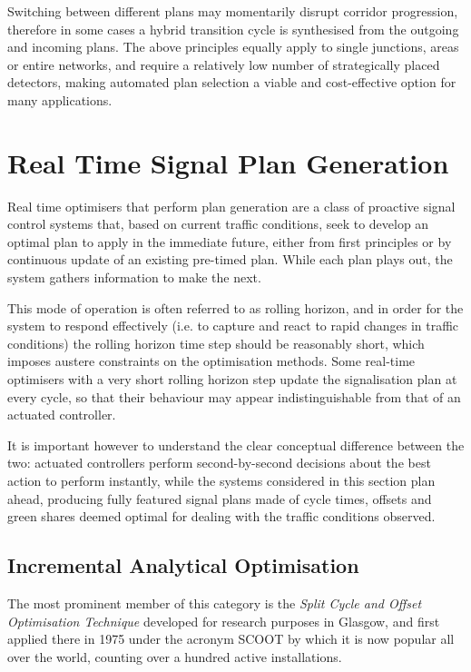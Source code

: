 Switching between different plans may momentarily disrupt corridor progression, therefore in
some cases a hybrid transition cycle is synthesised from the outgoing and incoming plans.
The above principles equally apply to single junctions, areas or entire networks, and require a
relatively low number of strategically placed detectors, making automated plan selection a
viable and cost-effective option for many applications.
 

\section{Real Time Signal Plan Generation}
Real time optimisers that perform plan generation are a class of proactive signal control systems that, based on current traffic conditions, seek to develop an optimal plan to apply in the immediate future, either from first principles or by continuous update of an existing pre-timed plan. While each plan plays out, the system gathers information to make the next.

This mode of operation is often referred to as rolling horizon, and in order for the system to respond effectively (i.e. to capture and react to rapid changes in traffic conditions) the rolling horizon time step should be reasonably short, which imposes austere constraints on the optimisation methods. Some real-time optimisers with a very short rolling horizon step update the signalisation plan at every cycle, so that their behaviour may appear indistinguishable from that of an actuated controller.

It is important however to understand the clear conceptual difference between the two: actuated controllers perform second-by-second decisions about the best action to perform instantly, while the systems considered in this section plan ahead, producing fully featured signal plans made of cycle times, offsets and green shares deemed optimal for dealing with the traffic conditions observed.

\subsection{Incremental Analytical Optimisation}
The most prominent member of this category is the \emph{Split Cycle and Offset Optimisation Technique} developed for research purposes in Glasgow, and first applied there in 1975 under the acronym SCOOT by which it is now popular all over the world, counting over a hundred active installations.

